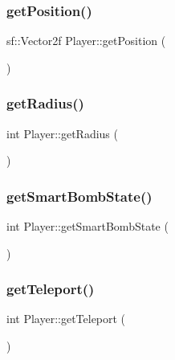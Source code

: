 \mbox{\label{class_player_a23356f99a9de86d3d47eadb679b332dc}} 
\subsubsection{\texorpdfstring{get\+Position()}{getPosition()}}
{\footnotesize\ttfamily sf\+::\+Vector2f Player\+::get\+Position (\begin{DoxyParamCaption}{ }\end{DoxyParamCaption})}

\mbox{\label{class_player_a96b2c2aa27ba5d756b12fddb2a841cc8}} 
\subsubsection{\texorpdfstring{get\+Radius()}{getRadius()}}
{\footnotesize\ttfamily int Player\+::get\+Radius (\begin{DoxyParamCaption}{ }\end{DoxyParamCaption})}

\mbox{\label{class_player_a5aaef7be6b70ec6069a861add36b5e2c}} 
\subsubsection{\texorpdfstring{get\+Smart\+Bomb\+State()}{getSmartBombState()}}
{\footnotesize\ttfamily int Player\+::get\+Smart\+Bomb\+State (\begin{DoxyParamCaption}{ }\end{DoxyParamCaption})}

\mbox{\label{class_player_a995b03fe2b8f0b47aa526c975a3b8254}} 
\subsubsection{\texorpdfstring{get\+Teleport()}{getTeleport()}}
{\footnotesize\ttfamily int Player\+::get\+Teleport (\begin{DoxyParamCaption}{ }\end{DoxyParamCaption})}

